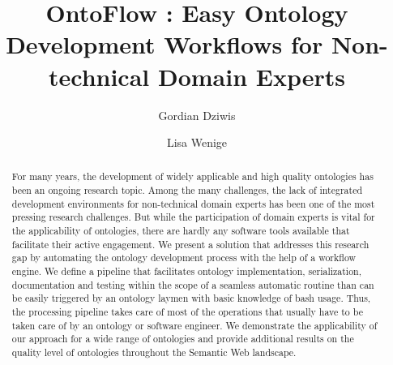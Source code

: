 \documentclass[sigconf]{acmart}
\begin{document}
\title{OntoFlow : Easy Ontology Development Workflows for Non-technical Domain Experts}

\author{Gordian Dziwis}
\authornote{}
\author{Lisa Wenige}
\authornotemark[1]

\renewcommand{\shortauthors}{Dziwis and Wenige et al.}

\begin{abstract}
	For many years, the development of widely applicable and high quality ontologies has been an ongoing research topic. Among the many challenges, the lack of integrated development environments for non-technical domain experts has been one of the most pressing research challenges. But while the participation of domain experts is vital for the applicability of ontologies, there are hardly any software tools available that facilitate their active engagement. We present a solution that addresses this research gap by automating the ontology development process with the help of a workflow engine. We define a pipeline that facilitates ontology implementation, serialization, documentation and testing within the scope of a seamless automatic routine than can be easily triggered by an ontology laymen with basic knowledge of bash usage. Thus, the processing pipeline takes care of most of the operations that usually have to be taken care of by an ontology or software engineer. We demonstrate the applicability of our approach for a wide range of ontologies and provide additional results on the quality level of ontologies throughout the Semantic Web landscape.
\end{abstract}
\end{document}
